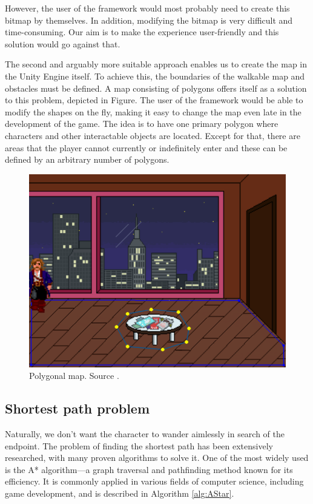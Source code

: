 However, the user of the framework would most probably need to create this bitmap by themselves. In addition, modifying the bitmap is very difficult and time-consuming. Our aim is to make the experience user-friendly and this solution would go against that. 

The second and arguably more suitable approach enables us to create the map in the Unity Engine itself. To achieve this, the boundaries of the walkable map and obstacles must be defined. A map consisting of polygons offers itself as a solution to this problem, depicted in Figure. The user of the framework would be able to modify the shapes on the fly, making it easy to change the map even late in the development of the game. The idea is to have one primary polygon where characters and other interactable objects are located. Except for that, there are areas that the player cannot currently or indefinitely enter and these can be defined by an arbitrary number of polygons. 


\begin{figure}[H]
\centering
\includegraphics[width=.8\linewidth]{img/WS-polygons2.png}
\caption{Polygonal map. Source \cite{Uurloon1}.}
\label{fig:Bitmap}
\end{figure}

\subsection{Shortest path problem}
Naturally, we don’t want the character to wander aimlessly in search of the endpoint. The problem of finding the shortest path has been extensively researched, with many proven algorithms to solve it. One of the most widely used is the A* algorithm—a graph traversal and pathfinding method known for its efficiency. It is commonly applied in various fields of computer science, including game development, and is described in Algorithm \ref{alg:AStar}. 

